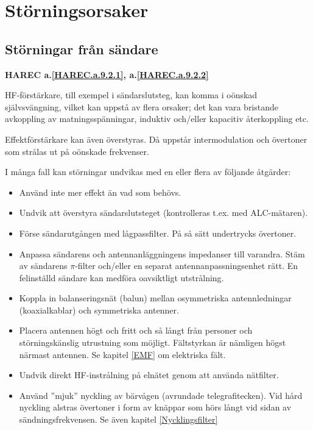 \section{Störningsorsaker}
\label{Störningsorsaker}
\subsection{Störningar från sändare}
\textbf{
HAREC a.\ref{HAREC.a.9.2.1}\label{myHAREC.a.9.2.1},
 a.\ref{HAREC.a.9.2.2}\label{myHAREC.a.9.2.2}
}

HF-förstärkare, till exempel i sändarslutsteg, kan komma i oönskad självsvängning,
vilket kan uppstå av flera orsaker; det kan vara bristande avkoppling av
matningsspänningar, induktiv och/eller kapacitiv återkoppling etc.

Effektförstärkare kan även överstyras.
Då uppstår intermodulation och övertoner som strålas ut på oönskade frekvenser.

I många fall kan störningar undvikas med en eller flera av följande åtgärder:
\begin{itemize}
	\item Använd inte mer effekt än vad som behövs.
\item Undvik att överstyra sändarslutsteget (kontrolleras t.ex. med
  ALC-mätaren).
\item Förse sändarutgången med lågpassfilter.
  På så sätt undertrycks övertoner.
\item Anpassa sändarens och antennanläggningens impedanser till varandra.
  Stäm av sändarens \(\pi\)-filter och/eller en separat antennanpassningsenhet
  rätt.
  En felinställd sändare kan medföra oavsiktligt utstrålning.
\item Koppla in balanseringsnät (balun) mellan osymmetriska antennledningar
  (koaxialkablar) och symmetriska antenner.
\item Placera antennen högt och fritt och så långt från personer och
  störningskänslig utrustning som möjligt.
  Fältstyrkan är nämligen högst närmast antennen.
  Se kapitel \ref{EMF} om elektriska fält.
\item Undvik direkt HF-instrålning på elnätet genom att använda nätfilter.
\item Använd ''mjuk'' nyckling av bärvågen (avrundade telegrafitecken).
  Vid hård nyckling alstras övertoner i form av knäppar som hörs långt vid
  sidan av sändningsfrekvensen. Se även kapitel \ref{Nycklingsfilter}
\end{itemize}

